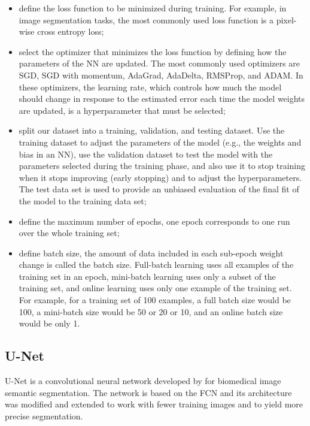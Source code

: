 \begin{itemize}
    \item define the loss function to be minimized during training. For example, in image segmentation tasks, the most commonly used loss function is a pixel-wise cross entropy loss;
    \item select the optimizer that minimizes the loss function by defining how the parameters of the \ac{NN} are updated. The most commonly used optimizers are \ac{SGD}, \ac{SGD} with momentum, \ac{AdaGrad}, \ac{AdaDelta}, RMSProp, and \ac{ADAM}. In these optimizers, the learning rate, which controls how much the model should change in response to the estimated error each time the model weights are updated, is a hyperparameter that must be selected;
    \item split our dataset into a training, validation, and testing dataset. Use the training dataset to adjust the parameters of the model (e.g., the weights and bias in an \ac{NN}), use the validation dataset to test the model with the parameters selected during the training phase, and also use it to stop training when it stops improving (early stopping) and to adjust the hyperparameters. The test data set is used to provide an unbiased evaluation of the final fit of the model to the training data set;
    \item define the maximum number of epochs, one epoch corresponds to one run over the whole training set;
    \item define batch size, the amount of data included in each sub-epoch weight change is called the batch size. Full-batch learning uses all examples of the training set in an epoch, mini-batch learning uses only a subset of the training set, and online learning uses only one example of the training set. For example, for a training set of 100 examples, a full batch size would be 100, a mini-batch size would be 50 or 20 or 10, and an online batch size would be only 1.
    
\end{itemize}



\subsection{U-Net}

U-Net is a convolutional neural network developed by \citet{Unet:2D} for biomedical image semantic segmentation. The network is based on the \ac{FCN} \cite{fcn} and its architecture was modified and extended to work with fewer training images and to yield more precise segmentation. 

